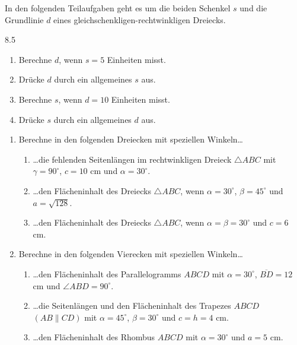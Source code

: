 \documentclass[11pt,oneside]{article}
\begin{document}
	\begin{aufgabe}
		In den folgenden Teilaufgaben geht es um die beiden Schenkel $s$ und die Grundlinie $d$ eines gleichschenkligen-rechtwinkligen Dreiecks.
		\begin{gridspace}{8.5}
			\begin{enumerate}[label=\alph*)]
				\item Berechne $d$, wenn $s=5$ Einheiten misst.\\
				\item Drücke $d$ durch ein allgemeines $s$ aus.\\
				\item Berechne $s$, wenn $d=10$ Einheiten misst.\\
				\item Drücke $s$ durch ein allgemeines $d$ aus.
			\end{enumerate}
		\end{gridspace}
	\end{aufgabe}
	\begin{aufgabe} %
		\begin{enumerate}
			\item Berechne in den folgenden Dreiecken mit speziellen Winkeln\ldots
			\begin{enumerate}[label=\alph*)]
				\item \ldots die fehlenden Seitenlängen im rechtwinkligen Dreieck $\triangle ABC$ mit $\gamma = 90^\circ$, $c=10$ cm und $\alpha=30^\circ$.
				\item \ldots den Flächeninhalt des Dreiecks $\triangle ABC$, wenn $\alpha=30^\circ$, $\beta=45^\circ$ und $a=\sqrt{128}$.
				\item \ldots den Flächeninhalt des Dreiecks $\triangle ABC$, wenn $\alpha=\beta=30^\circ$ und $c=6$ cm.
			\end{enumerate}
			\item Berechne in den folgenden Vierecken mit speziellen Winkeln\ldots
			\begin{enumerate}[label=\alph*)]
				\item \ldots den Flächeninhalt des Parallelogramms $ABCD$ mit $\alpha=30^\circ$, $\overline{BD}=12$ cm und $\angle ABD=90^\circ$.
				\item \ldots die Seitenlängen und den Flächeninhalt des Trapezes $ABCD$ {$(AB \parallel CD)$} mit $\alpha=45^\circ$, $\beta=30^\circ$ und $c=h=4$ cm.
				\item \ldots den Flächeninhalt des Rhombus $ABCD$ mit $\alpha=30^\circ$ und $a=5$ cm.
			\end{enumerate}
		\end{enumerate}
	\end{aufgabe}
\end{document}

